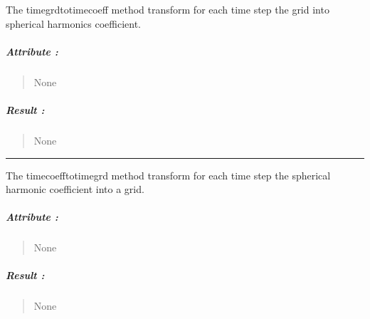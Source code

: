 \documentclass[letterpaper,10pt,english]{sphinxmanual}
\begin{document}
\begin{fulllineitems}
\label{\detokenize{GRID_doc/TIME_GRID_doc:SL_C0de.grid.TIME_GRID.timegrdtotimecoeff}}
\pysigstartsignatures
{}
\pysigstopsignatures
\sphinxAtStartPar
The \label{\detokenize{GRID_doc/TIME_GRID_doc:timegrdtotimecoeff}}timegrdtotimecoeff method transform for each time step the grid into spherical harmonics coefficient.


\subparagraph{Attribute :}
\label{\detokenize{GRID_doc/TIME_GRID_doc:attribute}}\begin{quote}

\sphinxAtStartPar
None
\end{quote}


\subparagraph{Result :}
\label{\detokenize{GRID_doc/TIME_GRID_doc:result}}\begin{quote}

\sphinxAtStartPar
None
\end{quote}

\end{fulllineitems}



\bigskip\hrule\bigskip


\begin{fulllineitems}
\label{\detokenize{GRID_doc/TIME_GRID_doc:SL_C0de.grid.TIME_GRID.timecoefftotimegrd}}
\pysigstartsignatures
{}
\pysigstopsignatures
\sphinxAtStartPar
The \label{\detokenize{GRID_doc/TIME_GRID_doc:timecoefftotimegrd}}timecoefftotimegrd method transform for each time step the spherical harmonic coefficient into a grid.


\subparagraph{Attribute :}
\label{\detokenize{GRID_doc/TIME_GRID_doc:id10}}\begin{quote}

\sphinxAtStartPar
None
\end{quote}


\subparagraph{Result :}
\label{\detokenize{GRID_doc/TIME_GRID_doc:id11}}\begin{quote}

\sphinxAtStartPar
None
\end{quote}

\end{fulllineitems}
\end{document}
